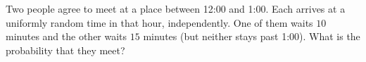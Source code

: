 Two people agree to meet at a place between 12:00 and 1:00. Each arrives at a uniformly random time in that hour, independently. One of them waits $10$ minutes and the other waits $15$ minutes (but neither stays past 1:00). What is the probability that they meet?
